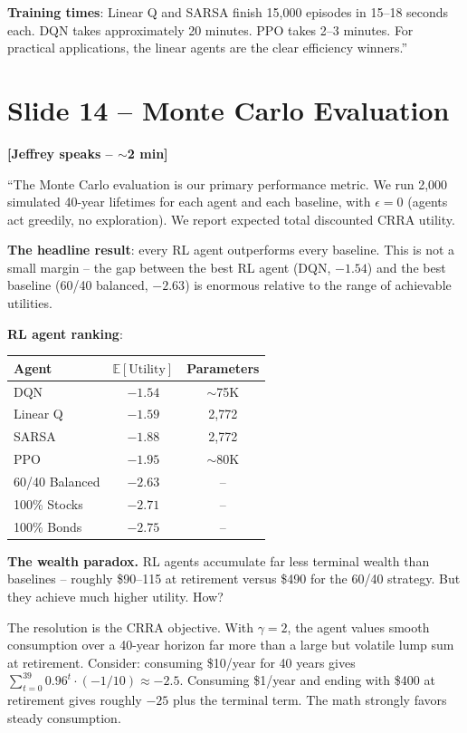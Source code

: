 \documentclass[11pt, letterpaper]{article}
\begin{document}
\textbf{Training times}: Linear Q and SARSA finish 15,000 episodes in 15--18 seconds each. DQN takes approximately 20 minutes. PPO takes 2--3 minutes. For practical applications, the linear agents are the clear efficiency winners.''

\section{Slide 14 -- Monte Carlo Evaluation}

\textbf{[Jeffrey speaks -- $\sim$2 min]}

``The Monte Carlo evaluation is our primary performance metric. We run 2,000 simulated 40-year lifetimes for each agent and each baseline, with $\epsilon = 0$ (agents act greedily, no exploration). We report expected total discounted CRRA utility.

\textbf{The headline result}: every RL agent outperforms every baseline. This is not a small margin -- the gap between the best RL agent (DQN, $-1.54$) and the best baseline (60/40 balanced, $-2.63$) is enormous relative to the range of achievable utilities.

\textbf{RL agent ranking}:
\begin{center}
\begin{tabular}{lcc}
\toprule
Agent & $\mathbb{E}[\text{Utility}]$ & Parameters \\
\midrule
DQN & $-1.54$ & $\sim$75K \\
Linear Q & $-1.59$ & 2,772 \\
SARSA & $-1.88$ & 2,772 \\
PPO & $-1.95$ & $\sim$80K \\
\midrule
60/40 Balanced & $-2.63$ & -- \\
100\% Stocks & $-2.71$ & -- \\
100\% Bonds & $-2.75$ & -- \\
\bottomrule
\end{tabular}
\end{center}

\textbf{The wealth paradox.} RL agents accumulate far less terminal wealth than baselines -- roughly \$90--115 at retirement versus \$490 for the 60/40 strategy. But they achieve much higher utility. How?

The resolution is the CRRA objective. With $\gamma = 2$, the agent values smooth consumption over a 40-year horizon far more than a large but volatile lump sum at retirement. Consider: consuming \$10/year for 40 years gives $\sum_{t=0}^{39} 0.96^t \cdot (-1/10) \approx -2.5$. Consuming \$1/year and ending with \$400 at retirement gives roughly $-25$ plus the terminal term. The math strongly favors steady consumption.
\end{document}
